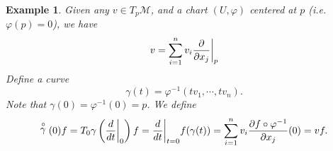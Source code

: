 \documentclass[8pt]{article}
\newtheorem{example}{Example}[section]
\newcommand{\M}[0]{\mathcal{M}}
\newcommand{\pd}[2]{{\frac {\partial #1} {\partial #2}}}
\begin{document}
\begin{example}
  Given any $v\in T_p\M$, and a chart $(U,\varphi)$ centered at $p$ (i.e. $\varphi(p) = 0$), we have 
  \begin{equation*}
    v = \sum_{i=1}^n v_i \pd{}{x_j}\bigg{|}_p
  \end{equation*}
  Define a curve 
  \begin{equation*}
    \gamma(t) = \varphi^{-1}(tv_1,\cdots,tv_n).
  \end{equation*}
  Note that $\gamma(0) = \varphi^{-1}(0) = p$. We define 
  \begin{equation*}
    \stackrel{\circ}{\gamma}(0)f = T_0\gamma\left({\frac {d} {dt}}\bigg{|}_0\right)f = {\frac d {dt}}\bigg{|}_{t=0}f(\gamma(t))=\sum_{i=1}^nv_i\pd{f\circ\varphi^{-1}}{x_j}(0) = vf.
  \end{equation*}
\end{example}
\end{document}

